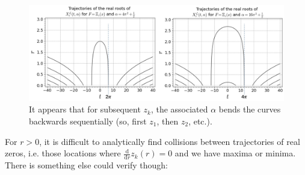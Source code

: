 \documentclass[a4paper,11pt,twoside]{amsart}
\begin{document}
\begin{figure}[H]
  \includegraphics[width=1\linewidth]{LaguerreCurvedXii.jpg}
  \caption{It appears that for subsequent $z_k$, the associated $\alpha$ bends the curves backwards sequentially (so, first $z_1$, then $z_2$, etc.). }
  \label{fig:flowLcurveXii}
\end{figure}

For $r > 0$, it is difficult to analytically find collisions between trajectories of real zeros, i.e. those locations where $\frac{\mathrm{d}}{\mathrm{d} r} z_k(r) = 0$ and we have maxima or minima. There is something else could verify though:
\end{document}
